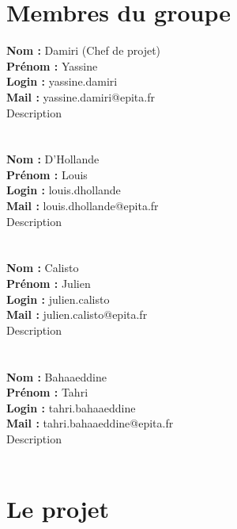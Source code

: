 \documentclass[12pt]{report}
\title{\HUGE{Cahier des charges}}
\author{- \textbf{\textit{\textwidth{Torideani}}} - 
\\ \textit{by} \\ \textit{The Smashing IT} \\ 
\\ Yassine Damiri \\ Louis D'Hollande \\ Julien Calisto \\
 Tahri Bahaaeddine }
\date{Vendredi 17 Janvier 2020}
\begin{document}
\maketitle

\tableofcontents

\chapter{Membres du groupe}
\noindent
\textbf{Nom :} Damiri (Chef de projet)\\
\textbf{Prénom :} Yassine\\
\textbf{Login :} yassine.damiri\\
\textbf{Mail :} yassine.damiri@epita.fr\\
Description \\ \\ \\
\textbf{Nom :} D'Hollande\\
\textbf{Prénom :} Louis\\
\textbf{Login :} louis.dhollande\\
\textbf{Mail :} louis.dhollande@epita.fr\\
Description \\ \\ \\
\textbf{Nom :} Calisto\\
\textbf{Prénom :} Julien\\
\textbf{Login :} julien.calisto\\
\textbf{Mail :} julien.calisto@epita.fr\\
Description \\ \\ \\
\textbf{Nom :} Bahaaeddine\\
\textbf{Prénom :} Tahri\\
\textbf{Login :} tahri.bahaaeddine\\
\textbf{Mail :} tahri.bahaaeddine@epita.fr\\
Description \\ \\



\chapter{Le projet}
\end{document}
